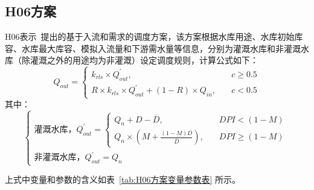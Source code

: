 \subsection{H06方案}
H06表示~\cite{hanasaki2006reservoir}提出的基于入流和需求的调度方案，该方案根据水库用途、水库初始库容、水库最大库容、模拟入流量和下游需水量等信息，分别为灌溉水库和非灌溉水库（除灌溉之外的用途均为非灌溉）设定调度规则，计算公式如下：
\begin{equation}
Q_{out}=\begin{cases}
k_{rls} \times Q_{out}^{'}, & \quad c \geq 0.5 \\
R \times k_{rls} \times Q_{out}^{'}+\left(1-R\right) \times Q_{in}, & \quad c<0.5
  \end{cases}
\end{equation}
%
其中：
\begin{equation}
\begin{cases}
\text{灌溉水库，} Q_{out}^{'}= \begin{cases}
Q_{n}+D-\overline{D}, &\quad DPI<(1-M)\\
Q_{n} \times \left(M+\frac{\left(1-M\right)D}{\overline{D}}\right), &\quad DPI \geq (1-M)
\end{cases}\\
\text{非灌溉水库，} Q_{out}^{'}=Q_{n}
\end{cases}
\end{equation}

上式中变量和参数的含义如表~\ref{tab:H06方案变量参数表} 所示。

